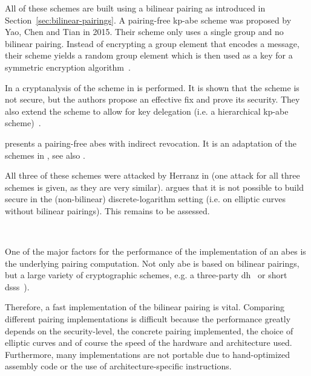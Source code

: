All of these schemes are built using a bilinear pairing as introduced in Section~\ref{sec:bilinear-pairings}.
A pairing-free \acrshort{kp-abe} scheme was proposed by Yao, Chen and Tian \cite{yao_lightweight_2015} in 2015.
Their scheme only uses a single group and no bilinear pairing.
Instead of encrypting a group element that encodes a message, their scheme yields a random group element which is then used as a key for a symmetric encryption algorithm~\cite{yao_lightweight_2015}.

In \cite{tan_enhancement_2019} a cryptanalysis of the scheme in \cite{yao_lightweight_2015} is performed.
It is shown that the scheme is not secure, but the authors propose an effective fix and prove its security.
They also extend the scheme to allow for key delegation (i.e. a hierarchical \acrshort{kp-abe} scheme)~\cite{tan_enhancement_2019}.

\cite{sowjanya_efficient_2020} presents a pairing-free \acrshort{abes} with indirect revocation.
It is an adaptation of the schemes in \cite{yao_lightweight_2015,tan_enhancement_2019}, see also \cite{herranz_attacking_2020}.

All three of these schemes were attacked by Herranz in \cite{herranz_attacking_2020} (one attack for all three schemes is given, as they are very similar).
\cite{herranz_attacking_2020} argues that it is not possible to build secure  in the (non-bilinear) discrete-logarithm setting (i.e. on elliptic curves without bilinear pairings).
This remains to be assessed.

~

One of the major factors for the performance of the implementation of an \acrshort{abes} is the underlying pairing computation.
Not only \acrshort{abe} is based on bilinear pairings, but a large variety of cryptographic schemes, e.g. a three-party \gls{dh}~\cite{joux_one_2000} or short \glspl{dss}~\cite{boneh_short_2001}).

Therefore, a fast implementation of the bilinear pairing is vital.
Comparing different pairing implementations is difficult because the performance greatly depends on the \gls{security-level}, the concrete pairing implemented, the choice of elliptic curves and of course the speed of the hardware and architecture used. 
Furthermore, many implementations are not portable due to hand-optimized assembly code or the use of architecture-specific instructions.


